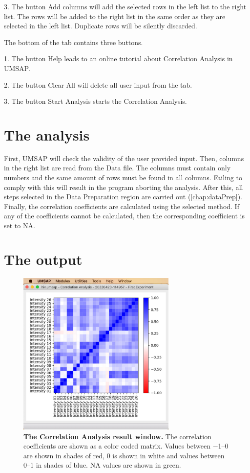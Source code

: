 \num{3}. The button Add columns will add the selected rows in the left list to
the right list. The rows will be added to the right list in the same order as
they are selected in the left list. Duplicate rows will be silently discarded.

The bottom of the tab contains three buttons.

\num{1}. The button Help leads to an online tutorial about Correlation Analysis in
UMSAP.

\num{2}. The button Clear All will delete all user input from the tab.

\num{3}. The button Start Analysis starts the Correlation Analysis.

\section{The analysis}

First, UMSAP will check the validity of the user provided input. Then, columns in
the right list are read from the Data file. The columns must contain only numbers
and the same amount of rows must be found in all columns. Failing to comply with
this will result in the program aborting the analysis. After this, all steps selected
in the Data Preparation region are carried out (\autoref{chap:dataPrep}). Finally,
the correlation coefficients are calculated using the selected method. If any of
the coefficients cannot be calculated, then the corresponding coefficient is set to NA.

\section{The output}

\begin{figure}[h]
    \centering
    \includegraphics[width=0.7\textwidth]{./IMAGES/UTIL-CORR-WINDOW/util-corr-res.jpg}
    \caption[The Correlation Analysis result window]{\textbf{The Correlation Analysis
    result window.} The correlation coefficients are shown as a color coded matrix.
    Values between \numrange{-1}{0} are shown in shades of red, \num{0} is shown in
    white and values between \numrange{0}{1} in shades of blue. NA values are shown
    in green.}
    \label{fig:utilCorrAnalysisRes}
    \vspace{-5pt} 	
\end{figure} 

